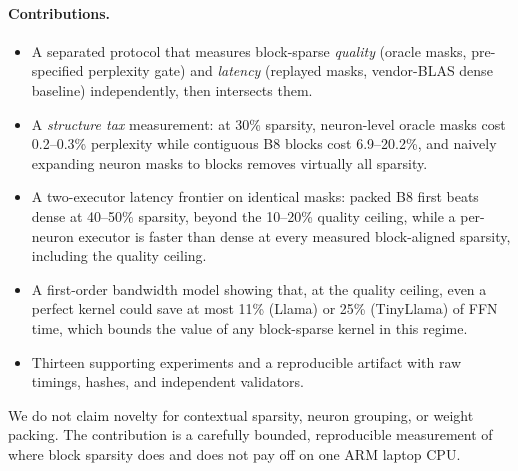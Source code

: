 \paragraph{Contributions.}
\begin{itemize}
\setlength\itemsep{1pt}
\item A separated protocol that measures block-sparse \emph{quality} (oracle
  masks, pre-specified perplexity gate) and \emph{latency} (replayed masks,
  vendor-BLAS dense baseline) independently, then intersects them.
\item A \emph{structure tax} measurement: at 30\% sparsity, neuron-level oracle
  masks cost 0.2--0.3\% perplexity while contiguous B8 blocks cost 6.9--20.2\%,
  and naively expanding neuron masks to blocks removes virtually all sparsity.
\item A two-executor latency frontier on identical masks: packed B8 first beats
  dense at 40--50\% sparsity, beyond the 10--20\% quality ceiling, while a
  per-neuron executor is faster than dense at every measured block-aligned
  sparsity, including the quality ceiling.
\item A first-order bandwidth model showing that, at the quality ceiling, even a
  perfect kernel could save at most 11\% (Llama) or 25\% (TinyLlama) of FFN
  time, which bounds the value of any block-sparse kernel in this regime.
\item Thirteen supporting experiments and a reproducible artifact with raw
  timings, hashes, and independent validators.
\end{itemize}

We do not claim novelty for contextual sparsity, neuron grouping, or weight
packing. The contribution is a carefully bounded, reproducible measurement of
where block sparsity does and does not pay off on one ARM laptop CPU.
